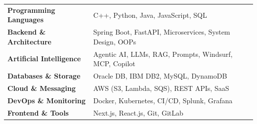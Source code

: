 \documentclass[a4paper,10pt]{article}
\newenvironment{zitemize}{
\begin{itemize}\itemsep0pt \parskip0pt \parsep1pt}
{\end{itemize}\vspace{-0.7cm}}
\newcommand{\hskills}[1]{
\textbf{\bfseries #1} }
\begin{document}

\begin{tabular*}{\textwidth}{@{\extracolsep{\fill}} l l}
\hskills{Programming Languages} & C++, Python, Java, JavaScript, SQL  \\
\hskills{Backend \& Architecture} & Spring Boot, FastAPI, Microservices, System Design, OOPs  \\
\hskills{Artificial Intelligence} & Agentic AI, LLMs, RAG, Prompts, Windsurf, MCP, Copilot  \\
\hskills{Databases \& Storage} & Oracle DB, IBM DB2, MySQL, DynamoDB  \\
\hskills{Cloud \& Messaging} & AWS (S3, Lambda, SQS), REST APIs, SaaS  \\
\hskills{DevOps \& Monitoring} & Docker, Kubernetes, CI/CD, Splunk, Grafana  \\
\hskills{Frontend \& Tools} & Next.js, React.js, Git, GitLab  \\
\end{tabular*}


\vspace{-0.4cm}


\end{document}

